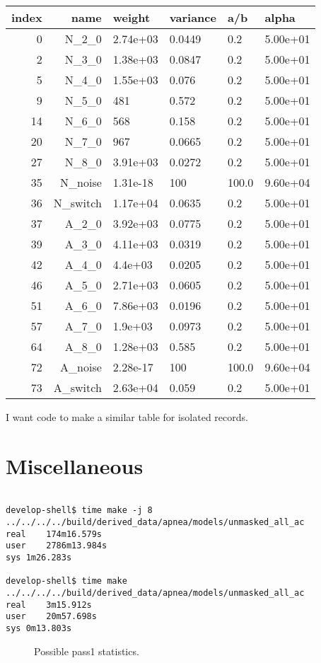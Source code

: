 \documentclass[12pt]{article}
\begin{document}
\begin{description}
  \begin{tabular*}{1.0\linewidth}[c]{rrllll}
    index & name & weight &  variance & a/b &    alpha \\ \hline
  0 & N\_2\_0     &    2.74e+03  &  0.0449 &  0.2& 5.00e+01 \\
  2 & N\_3\_0     &    1.38e+03  &  0.0847 &  0.2& 5.00e+01 \\
  5 & N\_4\_0     &    1.55e+03  &   0.076 &  0.2& 5.00e+01 \\
  9 & N\_5\_0     &    481       &   0.572 &  0.2& 5.00e+01 \\
 14 & N\_6\_0     &    568       &   0.158 &  0.2& 5.00e+01 \\
 20 & N\_7\_0     &    967       &  0.0665 &  0.2& 5.00e+01 \\
 27 & N\_8\_0     &    3.91e+03  &  0.0272 &  0.2& 5.00e+01 \\
 35 & N\_noise   &    1.31e-18  &     100 &100.0& 9.60e+04 \\
 36 & N\_switch  &    1.17e+04  &  0.0635 &  0.2& 5.00e+01 \\
 37 & A\_2\_0     &    3.92e+03  &  0.0775 &  0.2& 5.00e+01 \\
 39 & A\_3\_0     &    4.11e+03  &  0.0319 &  0.2& 5.00e+01 \\
 42 & A\_4\_0     &    4.4e+03   &  0.0205 &  0.2& 5.00e+01 \\
 46 & A\_5\_0     &    2.71e+03  &  0.0605 &  0.2& 5.00e+01 \\
 51 & A\_6\_0     &    7.86e+03  &  0.0196 &  0.2& 5.00e+01 \\
 57 & A\_7\_0     &    1.9e+03   &  0.0973 &  0.2& 5.00e+01 \\
 64 & A\_8\_0     &    1.28e+03  &   0.585 &  0.2& 5.00e+01 \\
 72 & A\_noise   &    2.28e-17  &     100 &100.0& 9.60e+04 \\
 73 & A\_switch  &    2.63e+04  &   0.059 &  0.2& 5.00e+01
  \end{tabular*}
  I want code to make a similar table for isolated records.

\end{description}

\section{Miscellaneous}
\label{sec:misc}
\begin{verbatim}

develop-shell$ time make -j 8 ../../../../build/derived_data/apnea/models/unmasked_all_ac  
real	174m16.579s
user	2786m13.984s
sys	1m26.283s

develop-shell$ time make ../../../../build/derived_data/apnea/models/unmasked_all_ac
real	3m15.912s
user	20m57.698s
sys	0m13.803s

\end{verbatim}

\begin{figure}
  \centering
    \caption{Possible pass1 statistics.}
  \label{fig:statistics}
\end{figure}
\end{document}
